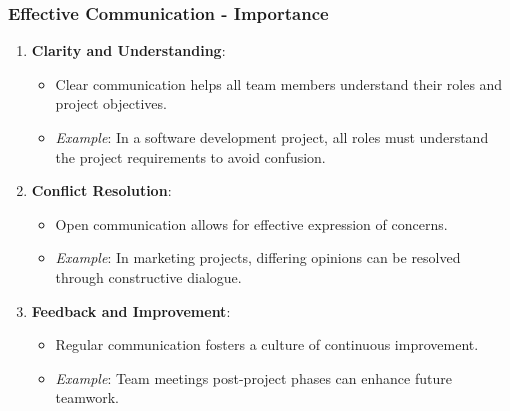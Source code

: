 \documentclass[aspectratio=169]{beamer}
\begin{document}
\begin{frame}[fragile]
    \frametitle{Effective Communication - Importance}
    \begin{enumerate}
        \item \textbf{Clarity and Understanding}:
            \begin{itemize}
                \item Clear communication helps all team members understand their roles and project objectives.
                \item \textit{Example}: In a software development project, all roles must understand the project requirements to avoid confusion.
            \end{itemize}
        
        \item \textbf{Conflict Resolution}:
            \begin{itemize}
                \item Open communication allows for effective expression of concerns.
                \item \textit{Example}: In marketing projects, differing opinions can be resolved through constructive dialogue.
            \end{itemize}
        
        \item \textbf{Feedback and Improvement}:
            \begin{itemize}
                \item Regular communication fosters a culture of continuous improvement.
                \item \textit{Example}: Team meetings post-project phases can enhance future teamwork.
            \end{itemize}
    \end{enumerate}
\end{frame}
\end{document}
